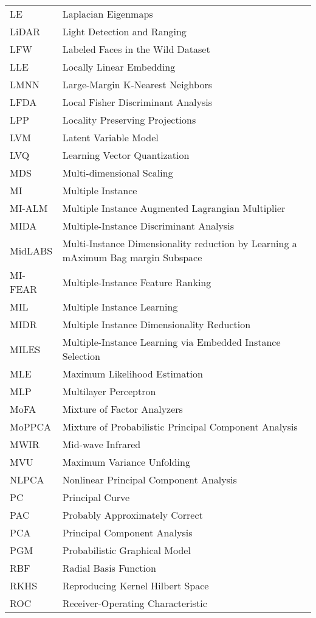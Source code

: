 \begin{longtable}{l p{5in}}
LE & Laplacian Eigenmaps\\
LiDAR & Light Detection and Ranging\\
LFW & Labeled Faces in the Wild Dataset\\
LLE & Locally Linear Embedding\\
LMNN & Large-Margin K-Nearest Neighbors\\
LFDA & Local Fisher Discriminant Analysis\\
LPP & Locality Preserving Projections\\
LVM & Latent Variable Model\\
LVQ & Learning Vector Quantization\\
MDS & Multi-dimensional Scaling\\
MI & Multiple Instance\\
MI-ALM & Multiple Instance Augmented Lagrangian Multiplier\\
MIDA & Multiple-Instance Discriminant Analysis\\
MidLABS & Multi-Instance Dimensionality reduction by Learning a mAximum Bag margin Subspace\\
MI-FEAR & Multiple-Instance Feature Ranking\\
MIL & Multiple Instance Learning\\
MIDR & Multiple Instance Dimensionality Reduction\\
MILES & Multiple-Instance Learning via Embedded Instance Selection\\
MLE & Maximum Likelihood Estimation\\
MLP & Multilayer Perceptron\\
MoFA & Mixture of Factor Analyzers\\
MoPPCA & Mixture of Probabilistic Principal Component Analysis\\
MWIR & Mid-wave Infrared\\
MVU & Maximum Variance Unfolding\\
NLPCA & Nonlinear Principal Component Analysis\\
PC & Principal Curve\\
PAC & Probably Approximately Correct\\ 
PCA & Principal Component Analysis\\
PGM & Probabilistic Graphical Model\\
RBF & Radial Basis Function\\
RKHS & Reproducing Kernel Hilbert Space\\
ROC & Receiver-Operating Characteristic\\

\end{longtable}
